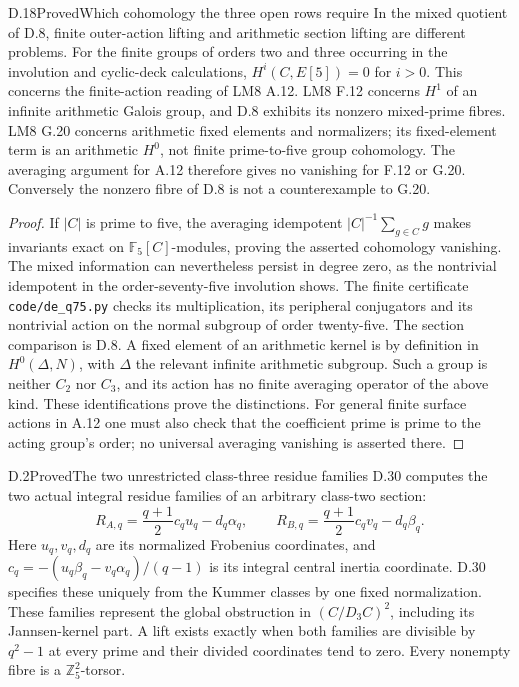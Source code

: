 \begin{statement}{D.18}{Proved}{Which cohomology the three open rows require}
In the mixed quotient of D.8, finite outer-action lifting
and arithmetic section lifting are different problems.
For the finite groups of orders two and three occurring
in the involution and cyclic-deck calculations,
\(H^i(C,E[5])=0\) for \(i>0\). This concerns the
finite-action reading of LM8 A.12. LM8 F.12 concerns
\(H^1\) of an infinite arithmetic Galois group, and
D.8 exhibits its nonzero mixed-prime fibres. LM8 G.20
concerns arithmetic fixed elements and normalizers;
its fixed-element term is an arithmetic \(H^0\), not
finite prime-to-five group cohomology. The averaging
argument for A.12 therefore gives no vanishing for
F.12 or G.20. Conversely the nonzero fibre of D.8
is not a counterexample to G.20.
\end{statement}
\begin{proof}
If \(|C|\) is prime to five, the averaging idempotent
\(|C|^{-1}\sum_{g\in C}g\) makes invariants exact on
\(\mathbb F_5[C]\)-modules, proving the asserted
cohomology vanishing. The mixed information can
nevertheless persist in degree zero, as the
nontrivial idempotent in the order-seventy-five
involution shows. The finite certificate
\texttt{code/de\_q75.py} checks its multiplication,
its peripheral conjugators and its nontrivial action
on the normal subgroup of order twenty-five.
The section comparison is D.8. A fixed element of
an arithmetic kernel is by definition in
\(H^0(\Delta,N)\), with \(\Delta\) the relevant
infinite arithmetic subgroup. Such a group is
neither \(C_2\) nor \(C_3\), and its action has no
finite averaging operator of the above kind.
These identifications prove the distinctions.
For general finite surface actions in A.12 one
must also check that the coefficient prime is
prime to the acting group's order; no universal
averaging vanishing is asserted there.
\end{proof}

\begin{statement}{D.2}{Proved}{The two unrestricted class-three residue families}
D.30 computes the two actual integral residue
families of an arbitrary class-two section:
\[
 R_{A,q}=\frac{q+1}{2}c_qu_q-d_q\alpha_q,
 \qquad
 R_{B,q}=\frac{q+1}{2}c_qv_q-d_q\beta_q.
\]
Here \(u_q,v_q,d_q\) are its normalized
Frobenius coordinates, and
\(c_q=-(u_q\beta_q-v_q\alpha_q)/(q-1)\)
is its integral central inertia coordinate.
D.30 specifies these uniquely from the
Kummer classes by one fixed normalization.
These families represent the global
obstruction in \((C/D_3C)^2\), including
its Jannsen-kernel part. A lift exists
exactly when both families are divisible
by \(q^2-1\) at every prime and their
divided coordinates tend to zero.
Every nonempty fibre is a
\(\mathbb Z_5^2\)-torsor.
\end{statement}

